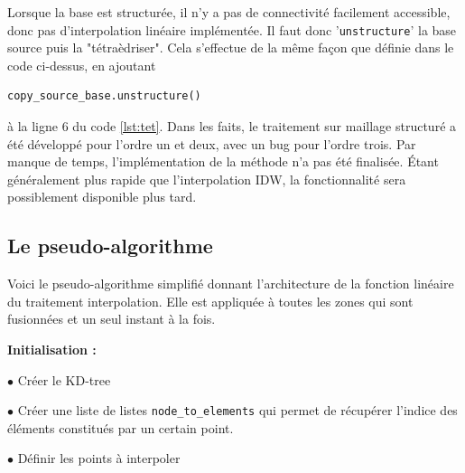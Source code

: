 Lorsque la base est structurée, il n'y a pas de connectivité facilement accessible, donc pas d'interpolation linéaire implémentée. Il faut donc '\texttt{unstructure}' la base source puis la "tétraèdriser". Cela s'effectue de la même façon que définie dans le code ci-dessus, en ajoutant 
\begin{lstlisting}[]
    copy_source_base.unstructure()
\end{lstlisting}
à la ligne 6 du code \ref{lst:tet}. Dans les faits, le traitement sur maillage structuré a été développé pour l'ordre un et deux, avec un bug pour l'ordre trois. Par manque de temps, l'implémentation de la méthode n'a pas été finalisée. Étant généralement plus rapide que l'interpolation IDW, la fonctionnalité sera possiblement disponible plus tard.


\newpage
\subsection{Le pseudo-algorithme}

Voici le pseudo-algorithme simplifié donnant l'architecture de la fonction linéaire du traitement interpolation. Elle est appliquée à toutes les zones qui sont fusionnées et un seul instant à la fois.

\vspace{0.3cm}

\textbf{Initialisation :}

$\bullet$ Créer le KD-tree

$\bullet$ Créer une liste de listes \texttt{node\_to\_elements} qui permet de récupérer l'indice des éléments constitués par un certain point.

$\bullet$ Définir les points à interpoler

\vspace{0.5cm}

